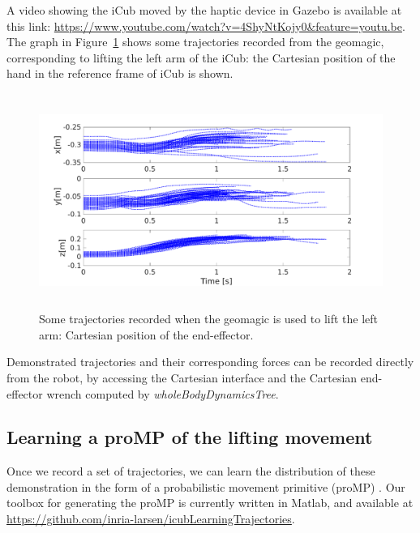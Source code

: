 A video showing the iCub moved by the haptic device in Gazebo is available at this link: \url{https://www.youtube.com/watch?v=4ShyNtKojy0&feature=youtu.be}.
The graph in Figure~\ref{fig:trajectories} shows some trajectories recorded from the geomagic, corresponding to lifting the left arm of the iCub: the Cartesian position of the hand in the reference frame of iCub is shown.
\begin{figure}[h]
\centering
\includegraphics[height=7cm]{figs/geomagic_lifting_trajectories.pdf}
\caption{Some trajectories recorded when the geomagic is used to lift the left arm: Cartesian position of the end-effector.}
\label{fig:trajectories}
\end{figure}

Demonstrated trajectories and their corresponding forces can be recorded directly from the robot, by accessing the Cartesian interface and the Cartesian end-effector wrench computed by \textit{wholeBodyDynamicsTree}.



 


\subsection{Learning a proMP of the lifting movement}

Once we record a set of trajectories, we can learn the distribution of these demonstration in the form of a probabilistic movement primitive (proMP) \cite{Paraschos_NIPS_2013a}.
Our toolbox for generating the proMP is currently written in Matlab, and available at \url{https://github.com/inria-larsen/icubLearningTrajectories}.

